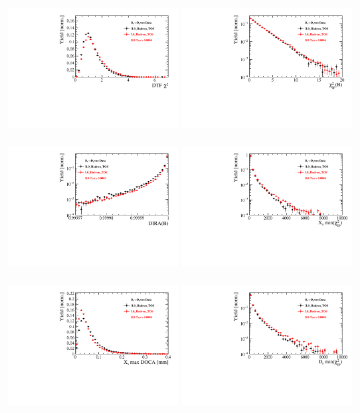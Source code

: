 \begin{figure}[h]
\centering
\includegraphics[height=!,width=0.4\textwidth]{figs/dataVsMC/trigger_norm/Ds2all_DTF_CHI2NDOF.pdf}
\includegraphics[height=!,width=0.4\textwidth]{figs/dataVsMC/trigger_norm/Ds2all_Bs_IPCHI2_OWNPV.pdf}

\includegraphics[height=!,width=0.4\textwidth]{figs/dataVsMC/trigger_norm/Ds2all_Bs_DIRA_OWNPV.pdf}
\includegraphics[height=!,width=0.4\textwidth]{figs/dataVsMC/trigger_norm/Ds2all_XsDaughters_min_IPCHI2.pdf}

\includegraphics[height=!,width=0.4\textwidth]{figs/dataVsMC/trigger_norm/Ds2all_Xs_max_DOCA.pdf}
\includegraphics[height=!,width=0.4\textwidth]{figs/dataVsMC/trigger_norm/Ds2all_DsDaughters_min_IPCHI2.pdf}


\end{figure}

